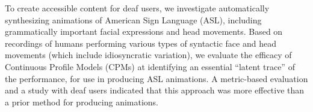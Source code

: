 To create accessible content for deaf users, we investigate automatically synthesizing animations of American Sign Language (ASL), including grammatically important facial expressions and head movements. Based on recordings of humans performing various types of syntactic face and head movements (which include idiosyncratic variation), we evaluate the efficacy of Continuous Profile Models (CPMs) at identifying an essential ``latent trace'' of the performance, for use in producing ASL animations. A metric-based evaluation and a study with deaf users indicated that this approach was more effective than a prior method for producing animations.
